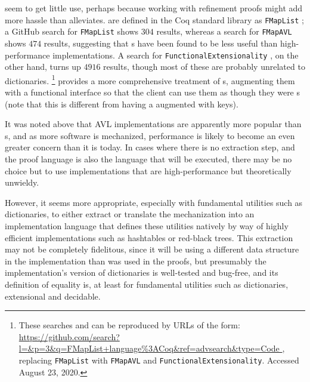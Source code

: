 
\Cals{} seem to get little use, perhaps because working with refinement proofs might add more hassle than \SemInj{} alleviates.
%
\Cals{} are defined in the Coq standard library as \texttt{FMapList} \citep{FMapList}; a GitHub search for \texttt{FMapList} shows $304$ results,
%
whereas a search for \texttt{FMapAVL} shows $474$ results, suggesting that {\cal}s have been found to be less useful than high-performance implementations.
%
A search for \texttt{FunctionalExtensionality} \citep{FunExt}, on the other hand, turns up $4916$ results, though most of these are probably unrelated to dictionaries.%
\footnote{\hspace{0.01in}%
%
These searches and can be reproduced by URLs of the form:
\url{https://github.com/search?l=\&p=3\&q=FMapList+language\%3ACoq\&ref=advsearch\&type=Code },
replacing \texttt{FMapList} with \texttt{FMapAVL} and \texttt{FunctionalExtensionality}.
%
Accessed August 23, 2020.
%
}
%
\citet{Amorim:fmap} provides a more comprehensive treatment of {\cal}s, augmenting them with a functional interface so that the client can
%
use them as though they were {\fpf}s (note that this is different from having a \fpf{} augmented with keys).


%
It was noted above that AVL implementations are apparently more popular than {\cal}s, and as more software is mechanized, performance is likely to become an
%
even greater concern than it is today. In cases where there is no extraction step, and the proof language is also the language that will be executed,
%
there may be no choice but to use implementations that are high-performance but theoretically unwieldy.

However, it seems more appropriate, especially with
%
fundamental utilities such as dictionaries, to either extract or translate the mechanization into an implementation language that defines these utilities natively
%
by way of highly efficient implementations such as hashtables or red-black trees. This extraction may not be completely fidelitous, since it will be using a
%
different data structure in the implementation than was used in the proofs, but presumably the implementation's version of dictionaries is well-tested and bug-free,
%
and its definition of equality is, at least for fundamental utilities such as dictionaries, extensional and decidable.

